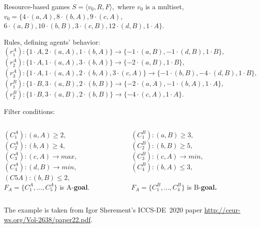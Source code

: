 \documentclass[10pt,dvipsnames]{beamer}
\begin{document}
\begin{frame}[fragile]{Resource-based games}
\noindent  $S=\langle v_0,R,F \rangle,$ where $v_0$ is a multiset, $v_0=\{4\cdot(a,A),8 ⋅ (b, A), 9 ⋅ (c, A),$
  $6 ⋅ (a, B), 10 ⋅ (b, B), 3 ⋅ (c, B), 12 ⋅ (d, B), 1 ⋅ A\}$.

  \noindent  Rules, defining agents' behavior:\\
$(r_1^A): \{1 \cdot  A, 2 \cdot  (a, A), 1 \cdot  (b, A)\} → \{−1 \cdot  (a, B), −1 \cdot  (d, B), 1 \cdot  B\},$
$(r_2^A): \{1 \cdot  A, 1 \cdot  (a, A), 3 \cdot  (b, A)\} → \{−2 \cdot  (a, B), 1 \cdot  B\},$
$(r_3^A): \{1 \cdot  A, 1 \cdot  (a, A), 2 \cdot  (b, A), 3 \cdot  (c, A)\} → \{−1 \cdot  (b, B), −4 \cdot  (d, B), 1 \cdot  B\},$
$(r_1^B): \{1 \cdot  B, 3 \cdot  (a, B), 2 \cdot  (b, B)\} → \{−2 \cdot  (a, A), −1 \cdot  (b, A), 1 \cdot  A\},$
$(r_2^B): \{1 \cdot  B, 3 \cdot  (a, B), 2 \cdot  (b, B)\} → \{−4 \cdot  (c, A), 1 \cdot  A\}.$

\noindent Filter conditions:

\begin{columns}
    \begin{column}{0.45\linewidth}
$(C_1^A): (a, A) ≥ 2,$\\
$(C_2^A): (b, A) ≥ 4,$\\
$(C_3^A): (c, A) \to max,$\\
$(C_4^A): (d, B) \to min,$\\
$(C 5A ): (b, B) ≤ 2,$\\
\alert{$F_A = \{C_1^A,\ldots, C_5^A\}$ is A-\bfseries goal}.
    \end{column}
    \begin{column}{0.45\linewidth}
$(C_1^B): (a, B) ≥ 3,$\\
$(C_2^B): (b, B) ≥ 5,$\\
$(C_3^B): (c, A) \to min,$\\
$(C_4^B): (b, A) ≤ 3,$\\
\mbox{$$}\\
\alert{$F_A = \{C_1^B,\ldots, C_4^B\}$ is B-\bfseries goal.}
    \end{column}
  \end{columns}
\vfill
\noindent The example is taken from Igor Sherement's ICCS-DE~2020 paper \url{http://ceur-ws.org/Vol-2638/paper22.pdf}.
\end{frame}
\end{document}
